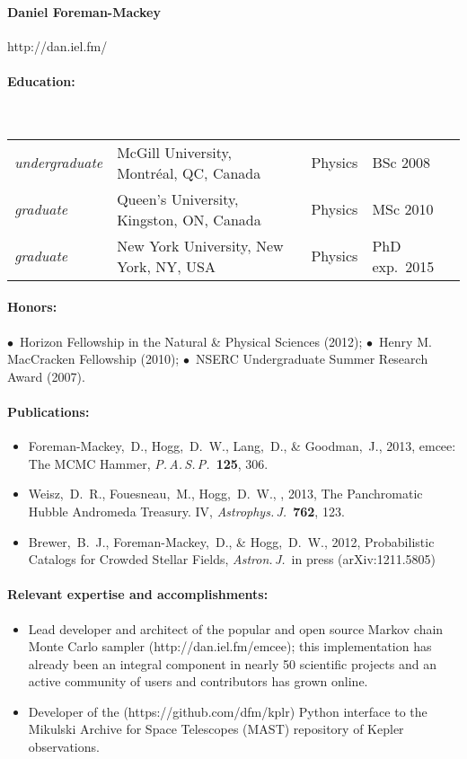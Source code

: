 \documentclass[letterpaper,12pt]{article}
\begin{document}
\paragraph{Daniel Foreman-Mackey} http://dan.iel.fm/

\paragraph{Education:}~\\
\begin{tabular}{llll}
\textsl{undergraduate}
  & McGill University, Montr\'eal, QC, Canada & Physics & BSc 2008\\
\textsl{graduate}
  & Queen's University, Kingston, ON, Canada & Physics & MSc 2010\\
\textsl{graduate}
  & New York University, New York, NY, USA & Physics & PhD exp.\ 2015
\end{tabular}

\paragraph{Honors:}
$\bullet$~Horizon Fellowship in the Natural \& Physical Sciences (2012);
$\bullet$~Henry M. MacCracken Fellowship (2010);
$\bullet$~NSERC Undergraduate Summer Research Award (2007).

\paragraph{Publications:}
\begin{itemize}\setlength{\itemsep}{0pt}
\item
Foreman-Mackey,~D., Hogg,~D.~W., Lang,~D., \& Goodman,~J., 2013,
emcee: The MCMC Hammer, \textit{P.\,A.\,S.\,P.}\ \textbf{125}, 306.
\item
Weisz,~D.~R., Fouesneau,~M., Hogg,~D.~W., \etal, 2013,
The Panchromatic Hubble Andromeda Treasury. IV,
\textit{Astrophys.\,J.}\ \textbf{762}, 123.
\item
Brewer,~B.~J., Foreman-Mackey,~D., \& Hogg,~D.~W., 2012,
Probabilistic Catalogs for Crowded Stellar Fields,
\textit{Astron.\,J.}\ in press (arXiv:1211.5805)
\end{itemize}

\paragraph{Relevant expertise and accomplishments:}
\begin{itemize}\setlength{\itemsep}{0pt}
\item
Lead developer and architect of the popular and open source Markov chain
Monte Carlo sampler  (http://dan.iel.fm/emcee); this
implementation has already been an integral component in nearly 50 scientific
projects and an active community of users and contributors has grown online.
\item
Developer of the  (https://github.com/dfm/kplr) Python interface
to the Mikulski Archive for Space Telescopes (MAST) repository of Kepler
observations.
\end{itemize}
\end{document}

